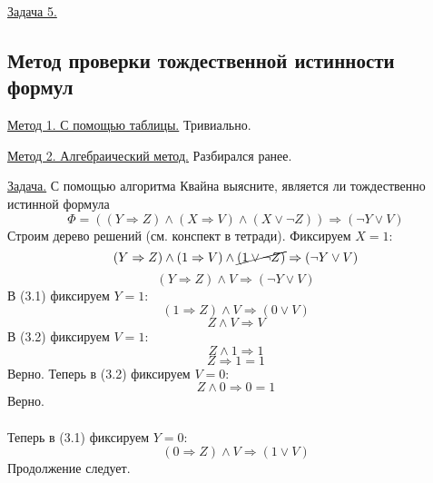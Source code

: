 \documentclass{SCWorks}
\begin{document}
\par \underline{Задача 5.}

\subsection{Метод проверки тождественной истинности формул}
\par \underline{Метод 1. С помощью таблицы.} Тривиально.
\par \underline{Метод 2. Алгебраический метод.} Разбирался ранее.

\par \underline{Задача.} С помощью алгоритма Квайна выясните, является ли тождественно истинной формула
\begin{equation*}
    \Phi = ((Y \Rightarrow Z) \land (X \Rightarrow V) \land (X \lor \neg Z)) \Rightarrow (\neg Y \lor V)
\end{equation*}
Строим дерево решений (см. конспект в тетради). Фиксируем $X = 1$:
\begin{equation*}
    (Y \Rightarrow Z) \land (1 \Rightarrow V) \land \cancel{(1 \lor \neg Z)} \Rightarrow (\neg Y \lor V)
\end{equation*}
\begin{equation}
    (Y \Rightarrow Z) \land V \Rightarrow (\neg Y \lor V)
\end{equation}
В (3.1) фиксируем $Y=1$:
\begin{equation*}
    (1 \Rightarrow Z) \land V \Rightarrow (0 \lor V)
\end{equation*}
\begin{equation}
    Z \land V \Rightarrow V
\end{equation}
В (3.2) фиксируем $V=1$:
\begin{equation*}
    Z \land 1 \Rightarrow 1
\end{equation*}
\begin{equation*}
    Z \Rightarrow 1 = 1
\end{equation*}
Верно. Теперь в (3.2) фиксируем $V=0$:
\begin{equation*}
    Z \land 0 \Rightarrow 0 = 1
\end{equation*}
Верно. \\ \\ Теперь в (3.1) фиксируем $Y=0$:
\begin{equation*}
    (0 \Rightarrow Z) \land V \Rightarrow (1 \lor V)
\end{equation*}
Продолжение следует.
\end{document}
